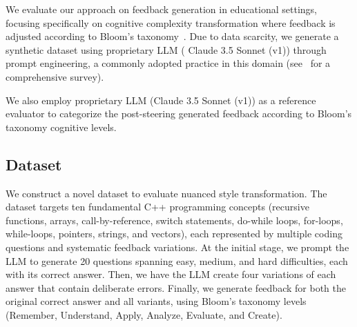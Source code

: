 We evaluate our approach on feedback generation in educational settings, focusing specifically on cognitive complexity transformation where feedback is adjusted according to Bloom's taxonomy~\cite{blooms}. Due to data scarcity, we generate a synthetic dataset using proprietary LLM ( Claude 3.5 Sonnet (v1)) through prompt engineering, a commonly adopted practice in this domain (see~\cite{liu2023pre,lu2023machine} for a comprehensive
survey). 

We also employ proprietary LLM (Claude 3.5 Sonnet (v1)) as a reference evaluator to categorize the post-steering generated feedback according to Bloom's taxonomy cognitive levels.



\subsection{Dataset}

We construct a novel dataset to evaluate nuanced style transformation. The dataset targets ten fundamental C++ programming concepts (recursive functions, arrays, call-by-reference, switch statements, do-while loops, for-loops, while-loops, pointers, strings, and vectors), each represented by multiple coding questions and systematic feedback variations. At the initial stage, we prompt the LLM to generate 20 questions spanning easy, medium, and hard difficulties, each with its correct answer. Then, we have the LLM create four variations of each answer that contain deliberate errors. Finally, we generate feedback for both the original correct answer and all variants, using Bloom's taxonomy levels~\cite{blooms} (Remember, Understand, Apply, Analyze, Evaluate, and Create). 










